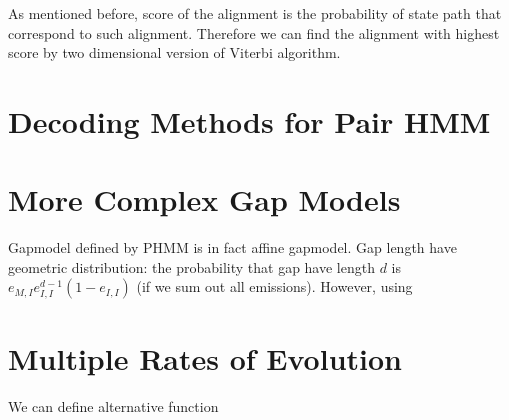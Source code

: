 As mentioned before, score of the alignment is the probability of state path
that correspond to such alignment. Therefore we can find the alignment with 
highest score by two dimensional version of Viterbi algorithm. 

\section{Decoding Methods for Pair HMM}


\section{More Complex Gap Models}
Gapmodel defined by PHMM is in fact affine gapmodel.
Gap length have geometric distribution: the probability that gap have length $d$
is $e_{M,I}e_{I,I}^{d-1}(1-e_{I,I})$ (if we sum out all emissions). However,
using

\section{Multiple Rates of Evolution}

We can define alternative function 
